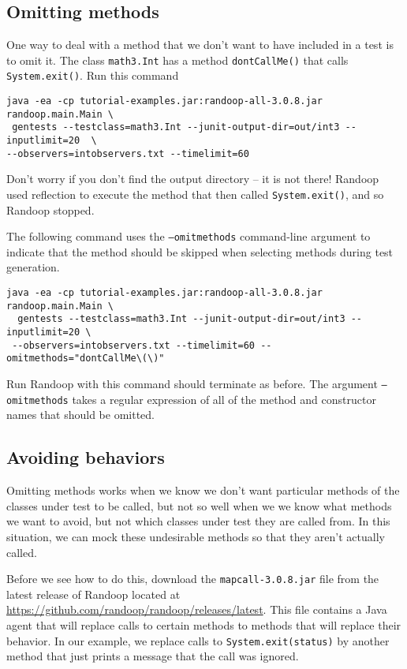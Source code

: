 \documentclass[11pt, oneside]{article} %
\newcommand{\code}[1]{{\texttt{#1}}}
\newcommand{\cmd}[1]{{\texttt{#1}}}
\begin{document}
\subsection{Omitting methods}
One way to deal with a method that we don't want to have included in a test is to omit it.
The class \code{math3.Int} has a method \code{dontCallMe()} that calls \code{System.exit()}.
Run this command 
\begin{verbatim}
java -ea -cp tutorial-examples.jar:randoop-all-3.0.8.jar randoop.main.Main \ 
 gentests --testclass=math3.Int --junit-output-dir=out/int3 --inputlimit=20  \
--observers=intobservers.txt --timelimit=60
\end{verbatim}
Don't worry if you don't find the output directory -- it is not there!
Randoop used reflection to execute the method that then called \code{System.exit()}, and so Randoop stopped.

The following command uses the \cmd{--omitmethods} command-line argument to indicate that the method should be skipped when selecting methods during test generation.
\begin{verbatim}
java -ea -cp tutorial-examples.jar:randoop-all-3.0.8.jar randoop.main.Main \
  gentests --testclass=math3.Int --junit-output-dir=out/int3 --inputlimit=20 \
 --observers=intobservers.txt --timelimit=60 --omitmethods="dontCallMe\(\)"
\end{verbatim}
Run Randoop with this command should terminate as before.
The argument  \cmd{--omitmethods} takes a regular expression of all of the method and constructor names that should be omitted.

\subsection{Avoiding behaviors}
Omitting methods works when we know we don't want particular methods of the classes under test to be called, but not so well when we we know what methods we want to avoid, but not which classes under test they are called from.
In this situation, we can mock these undesirable methods so that they aren't actually called.

Before we see how to do this, download the \texttt{mapcall-3.0.8.jar} file from the latest release of Randoop located at \url{https://github.com/randoop/randoop/releases/latest}.
This file contains a Java agent that will replace calls to certain methods to methods that will replace their behavior.
In our example, we replace calls to \code{System.exit(status)} by another method that just prints a message that the call was ignored.
\end{document}
